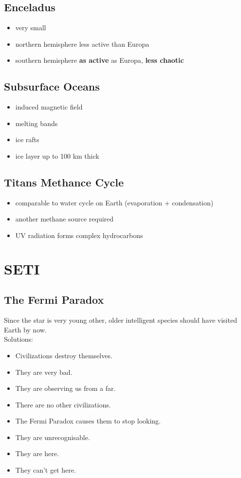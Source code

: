 \documentclass{article}
\theoremstyle{sltheorem}
\begin{document}
\subsection{Enceladus}
\begin{itemize}
    \item very small
    \item northern hemisphere less active than Europa
    \item southern hemisphere \textbf{as active} as Europa, \textbf{less chaotic}
\end{itemize}
\subsection{Subsurface Oceans}
\begin{itemize}
    \item induced magnetic field
    \item melting bands
    \item ice rafts
    \item ice layer up to 100 km thick
\end{itemize}
\subsection{Titans Methance Cycle}
\begin{itemize}
    \item comparable to water cycle on Earth (evaporation + condensation)
    \item another methane source required
    \item UV radiation forms complex hydrocarbons
\end{itemize}
\section{SETI}
\subsection{The Fermi Paradox}
Since the star is very young other, older intelligent species should have visited Earth by now.\\
Solutions:
\begin{itemize}
    \item Civilizations destroy themselves.
    \item They are very bad.
    \item They are observing us from a far.
    \item There are no other civilizations.
    \item The Fermi Paradox causes them to stop looking.
    \item They are unrecognisable.
    \item They are here.
    \item They can't get here.
\end{itemize}
\end{document}
